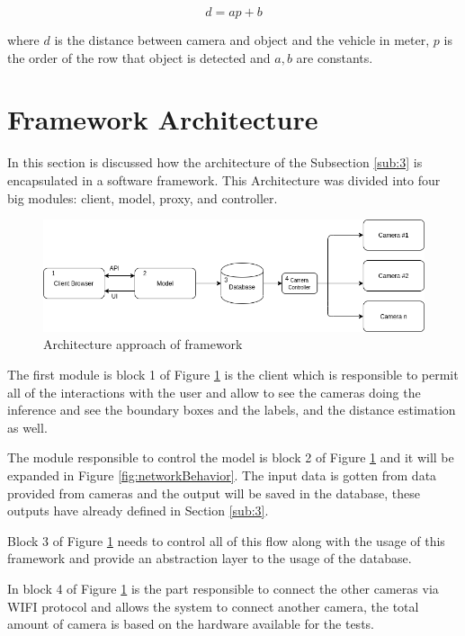 \begin{equation}
    \label{eq:eq4}
    d = ap+b
\end{equation}

where $d$ is the distance between camera and object and the vehicle in meter, $p$ is the order of the row that object is detected and $a, b$ are constants.

 
\section{Framework Architecture} \label{framework}

In this section is discussed how the architecture of the Subsection \ref{sub:3} is encapsulated in a software framework. This Architecture was divided into four big modules: client, model, proxy, and controller. 



\begin{figure}[H]
\centering
\includegraphics[scale=0.6]{imagens/diagram.png}
\caption{Architecture approach of framework}
\label{fig:framework}
\end{figure}

The first module is block 1 of Figure \ref{fig:framework} is the client which is responsible to permit all of the interactions with the user and allow to see the cameras doing the inference and see the boundary boxes and the labels, and the distance estimation as well.

The module responsible to control the model is block 2 of Figure \ref{fig:framework} and it will be expanded in Figure \ref{fig:networkBehavior}. The input data is gotten from data provided from cameras and the output will be saved in the database, these outputs have already defined in Section \ref{sub:3}. 

Block 3 of Figure \ref{fig:framework} needs to control all of this flow along with the usage of this framework and provide an abstraction layer to the usage of the database. 

In block 4 of Figure \ref{fig:framework} is the part responsible to connect the other cameras via WIFI protocol and allows the system to connect another camera, the total amount of camera is based on the hardware available for the tests. 


